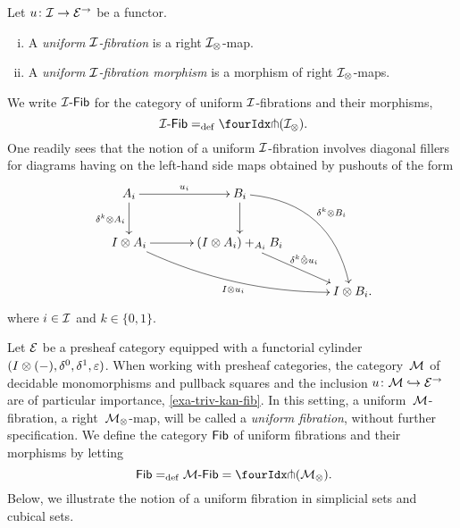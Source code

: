 \documentclass[reqno,10pt,a4paper,oneside,draft]{amsart}
\begin{document}
\begin{definition} \label{def:I-fibration}
Let $u \co \cal{I} \to \catE^\to$ be a functor.
\begin{enumerate}[(i)]
\item A \emph{uniform $\cal{I}$-fibration} is a right $\cal{I}_\otimes$-map.
\item A \emph{uniform $\cal{I}$-fibration morphism} is a morphism of right $\cal{I}_\otimes$-maps.
\end{enumerate}
\end{definition}

We write $\Fib[\cal{I}]$ for the category of uniform $\cal{I}$-fibrations and their morphisms, \ie
\[
\Fib[\cal{I}] \defeq \liftr{(\cal{I}_\otimes)} \rlap{.}
\]
One readily sees that the notion of a uniform $\cal{I}$-fibration involves diagonal fillers for diagrams having on the left-hand side maps obtained by pushouts of the form
\begin{gather*}
\xymatrix@C=1.2cm{
  A_i \ar[r]^{u_i} \ar[d]_{\kcyl \otimes A_i} & B_i \ar@/^2pc/[ddr]^{\kcyl \otimes B_i} \ar[d] & \\
  \interval \otimes A_i \ar@/_1pc/[drr]_{\interval \otimes u_i} \ar[r] & (\interval \otimes A_i) +_{A_i} B_i \ar[dr]^-{\delta^k \hatotimes u_i} & \\
  & & \interval \otimes B_i
\rlap{.}}
\end{gather*}
where $i \in \cal{I}$ and $k \in \{0, 1 \}$.


\begin{example}
Let $\catE$ be a presheaf category equipped with a functorial cylinder $(\interval \otimes (-), \lcyl, \rcyl, \ccyl)$.
When working with presheaf categories, the category~$\cal{M}$ of decidable monomorphisms and pullback squares and the inclusion $u \co \cal{M} \hookrightarrow \catE^\to$ are of particular importance, \cf \cref{exa-triv-kan-fib}.
In this setting, a uniform~$\cal{M}$-fibration, \ie a right~$\cal{M}_\otimes$-map, will be called a \emph{uniform fibration}, without further specification.
We define the category $\Fib$ of uniform fibrations and their morphisms by letting
\[
  \Fib \defeq \Fib[\cal{M}] = \liftr{(\cal{M}_\otimes)} \rlap{.}
\]
Below, we illustrate the notion of a uniform fibration in simplicial sets and cubical sets.
\end{example}
\end{document}
